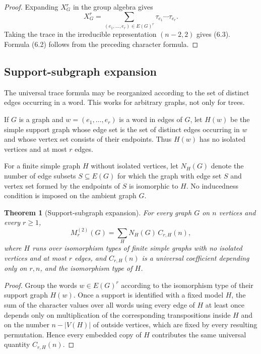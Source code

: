 \documentclass{amsart}
\newtheorem{theorem}{Theorem}
\theoremstyle{definition}
\begin{document}
\begin{proof}
Expanding $X_G^r$ in the group algebra gives
\[
X_G^r=\sum_{(e_1,\ldots,e_r)\in E(G)^r}
\tau_{e_1}\cdots\tau_{e_r}.
\]
Taking the trace in the irreducible representation $(n-2,2)$ gives
(6.3).  Formula (6.2) follows from the preceding character formula.
\end{proof}

\subsection{Support-subgraph expansion}

The universal trace formula may be reorganized according to the set of
distinct edges occurring in a word.  This works for arbitrary graphs, not
only for trees.

If $G$ is a graph and $w=(e_1,\ldots,e_r)$ is a word in edges of $G$, let
$H(w)$ be the simple support graph whose edge set is the set of distinct
edges occurring in $w$ and whose vertex set consists of their endpoints.
Thus $H(w)$ has no isolated vertices and at most $r$ edges.

For a finite simple graph $H$ without isolated vertices, let $N_H(G)$ denote
the number of edge subsets $S\subseteq E(G)$ for which the graph with edge
set $S$ and vertex set formed by the endpoints of $S$ is isomorphic to $H$.
No inducedness condition is imposed on the ambient graph $G$.

\begin{theorem}[Support-subgraph expansion]
For every graph $G$ on $n$ vertices and every $r\geq1$,
\[
M_r^{(2)}(G)=
\sum_H N_H(G)\,C_{r,H}(n),
\tag{6.4}
\]
where $H$ runs over isomorphism types of finite simple graphs with no
isolated vertices and at most $r$ edges, and $C_{r,H}(n)$ is a universal
coefficient depending only on $r,n$, and the isomorphism type of $H$.
\end{theorem}

\begin{proof}
Group the words $w\in E(G)^r$ according to the isomorphism type of their
support graph $H(w)$.  Once a support is identified with a fixed model $H$,
the sum of the character values over all words using every edge of $H$ at
least once depends only on multiplication of the corresponding
transpositions inside $H$ and on the number $n-|V(H)|$ of outside vertices,
which are fixed by every resulting permutation.  Hence every embedded copy
of $H$ contributes the same universal quantity $C_{r,H}(n)$.
\end{proof}
\end{document}
